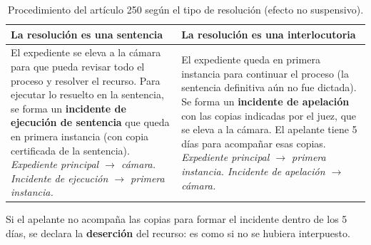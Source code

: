 \documentclass[12pt,oneside]{book}
\begin{document}
\begin{table}[H]
\centering
\begin{tabularx}{\textwidth}{
    >{\raggedright\arraybackslash}X
    >{\raggedright\arraybackslash}X
}
\toprule
\textbf{La resolución es una sentencia} & \textbf{La resolución es una interlocutoria} \\
\midrule
El expediente se eleva a la cámara para que pueda revisar todo el proceso y resolver el recurso. Para ejecutar lo resuelto en la sentencia, se forma un \textbf{incidente de ejecución de sentencia} que queda en primera instancia (con copia certificada de la sentencia). \newline
\textit{Expediente principal $\rightarrow$ cámara. Incidente de ejecución $\rightarrow$ primera instancia.} &
El expediente queda en primera instancia para continuar el proceso (la sentencia definitiva aún no fue dictada). Se forma un \textbf{incidente de apelación} con las copias indicadas por el juez, que se eleva a la cámara. El apelante tiene 5 días para acompañar esas copias. \newline
\textit{Expediente principal $\rightarrow$ primera instancia. Incidente de apelación $\rightarrow$ cámara.} \\
\bottomrule
\end{tabularx}
\caption{Procedimiento del artículo 250 según el tipo de resolución (efecto no suspensivo).}
\end{table}

Si el apelante no acompaña las copias para formar el incidente dentro de los 5 días, se declara la \textbf{deserción} del recurso: es como si no se hubiera interpuesto.
\end{document}

